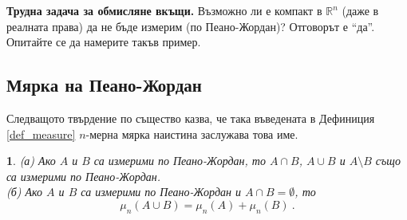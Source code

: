 \documentclass[11pt]{article}
\numberwithin{equation}{section}
\numberwithin{figure}{section}
\numberwithin{table}{section}
\theoremstyle{plain}
\theoremstyle{definition}
\theoremstyle{remark}
\theoremstyle{definition}
\theoremstyle{remark}
\theoremstyle{plain}
\theoremstyle{definition}
\theoremstyle{definition}
\theoremstyle{plain}
\theoremstyle{plain}
\newtheorem{prop}[thm]{\protect\propositionname}
\theoremstyle{plain}
\theoremstyle{definition}
\theoremstyle{plain}
\providecommand{\propositionname}{Твърдение}
\newcommand*{\R}{\mathbb{R}}
\begin{document}
\medskip

\textbf{Трудна задача за обмисляне вкъщи.} Възможно ли е компакт в $\R^n$ (даже в реалната права) да не бъде измерим (по Пеано-Жордан)? Отговорът е ``да''. Опитайте се да намерите такъв пример.

\subsection{Мярка на Пеано-Жордан}

Следващото твърдение по същество казва, че така въведената в Дефиниция \ref{def_measure} $n$-мерна мярка наистина заслужава това име.

\begin{prop}
(а) Ако $A$ и $B$ са измерими по Пеано-Жордан, то $A \cap B$, $A\cup B$ и $A\setminus B$ също са измерими по Пеано-Жордан.
\\(б) Ако $A$ и $B$ са измерими по Пеано-Жордан и $A \cap B=\emptyset$, то $$\mu_n(A\cup B)=\mu_n(A) + \mu_n(B) \ .$$
\end{prop}
\end{document}
